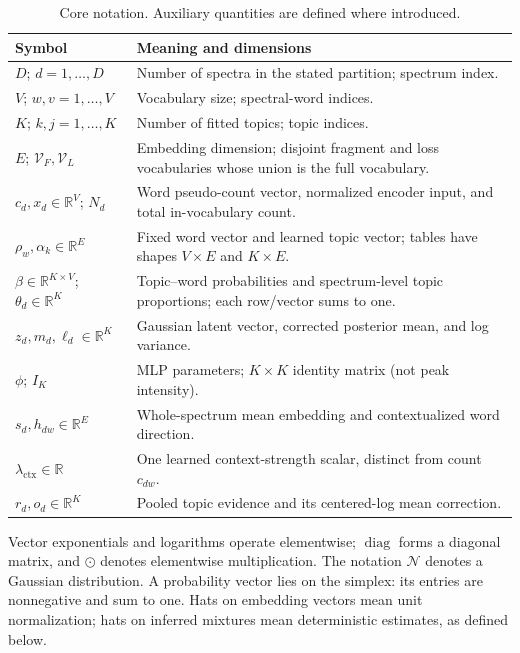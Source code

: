 \documentclass[10pt,a4paper]{article}
\newcommand{\ctxscale}{\lambda_{\mathrm{ctx}}}
\begin{document}
\begin{table}[H]
\centering\small
\caption{Core notation. Auxiliary quantities are defined where introduced.}
\label{tab:notation}
\renewcommand{\arraystretch}{1.12}
\begin{tabularx}{\textwidth}{@{}p{3.6cm}X@{}}
\toprule
Symbol & Meaning and dimensions \\
\midrule
$D$; $d=1,\ldots,D$ & Number of spectra in the stated partition; spectrum index. \\
$V$; $w,v=1,\ldots,V$ & Vocabulary size; spectral-word indices. \\
$K$; $k,j=1,\ldots,K$ & Number of fitted topics; topic indices. \\
$E$; $\mathcal V_F,\mathcal V_L$ & Embedding dimension; disjoint fragment and loss vocabularies whose union is the full vocabulary. \\
$c_d,x_d\in\mathbb R^V$; $N_d$ & Word pseudo-count vector, normalized encoder input, and total in-vocabulary count. \\
$\rho_w,\alpha_k\in\mathbb R^E$ & Fixed word vector and learned topic vector; tables have shapes $V\times E$ and $K\times E$. \\
$\beta\in\mathbb R^{K\times V}$; $\theta_d\in\mathbb R^K$ & Topic--word probabilities and spectrum-level topic proportions; each row/vector sums to one. \\
$z_d,m_d,\ell_d\in\mathbb R^K$ & Gaussian latent vector, corrected posterior mean, and log variance. \\
$\phi$; $I_K$ & MLP parameters; $K\times K$ identity matrix (not peak intensity). \\
$s_d,h_{dw}\in\mathbb R^E$ & Whole-spectrum mean embedding and contextualized word direction. \\
$\ctxscale\in\mathbb R$ & One learned context-strength scalar, distinct from count $c_{dw}$. \\
$r_d,o_d\in\mathbb R^K$ & Pooled topic evidence and its centered-log mean correction. \\
\bottomrule
\end{tabularx}
\end{table}

Vector exponentials and logarithms operate elementwise; $\operatorname{diag}$
forms a diagonal matrix, and $\odot$ denotes elementwise multiplication.
The notation $\mathcal N$ denotes a Gaussian distribution. A probability
vector lies on the simplex: its entries are nonnegative and sum to one.
Hats on embedding vectors mean unit normalization; hats on inferred mixtures
mean deterministic estimates, as defined below.
\end{document}
